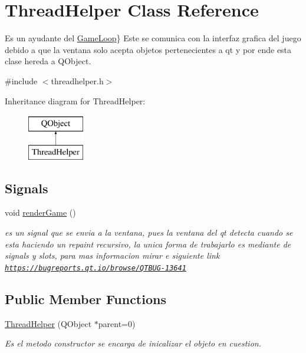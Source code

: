 \hypertarget{class_thread_helper}{\section{Thread\-Helper Class Reference}
\label{class_thread_helper}
}


Es un ayudante del \hyperlink{class_game_loop}{Game\-Loop}\} Este se comunica con la interfaz grafica del juego debido a que la ventana solo acepta objetos pertenecientes a qt y por ende esta clase hereda a Q\-Object.  




{\ttfamily \#include $<$threadhelper.\-h$>$}

Inheritance diagram for Thread\-Helper\-:\begin{figure}[H]
\begin{center}
\leavevmode
\includegraphics[height=2.000000cm]{class_thread_helper}
\end{center}
\end{figure}
\subsection*{Signals}
\begin{DoxyCompactItemize}
\item 
\hypertarget{class_thread_helper_a2c3a5fdda82b0759fabc037088edd19c}{void \hyperlink{class_thread_helper_a2c3a5fdda82b0759fabc037088edd19c}{render\-Game} ()}\label{class_thread_helper_a2c3a5fdda82b0759fabc037088edd19c}

\begin{DoxyCompactList}\small\item\em es un signal que se envia a la ventana, pues la ventana del qt detecta cuando se esta haciendo un repaint recursivo, la unica forma de trabajarlo es mediante de signals y slots, para mas informacion mirar e siguiente link \href{https://bugreports.qt.io/browse/QTBUG-13641}{\tt https\-://bugreports.\-qt.\-io/browse/\-Q\-T\-B\-U\-G-\/13641} \end{DoxyCompactList}\end{DoxyCompactItemize}
\subsection*{Public Member Functions}
\begin{DoxyCompactItemize}
\item 
\hyperlink{class_thread_helper_ae7f17139fdf7b9c32503651b77c60e5b}{Thread\-Helper} (Q\-Object $\ast$parent=0)
\begin{DoxyCompactList}\small\item\em Es el metodo constructor se encarga de inicalizar el objeto en cuestion. \end{DoxyCompactList}\end{DoxyCompactItemize}


